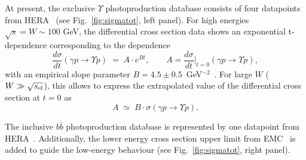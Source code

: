 \documentclass[10pt,prd,aps,nofootinbib,superscriptaddress]{revtex4}
\newcommand{\beq}{\begin{equation}}
\newcommand{\eeq}{\end{equation}}
\begin{document}
At present, the exclusive $\Upsilon$ photoproduction database
consists of four datapoints from HERA~\cite{Adloff:2000vm, Breitweg:1998ki, Chekanov:2009zz}
(see Fig.~\ref{fig:sigmatot}, left panel).
For high energies $\sqrt{s} = W\sim100$ GeV, the differential cross section data shows an exponential t-dependence 
corresponding to the dependence
\beq
\frac{d \sigma}{dt} (\gamma p \to \Upsilon p)
\;=\; A \cdot e^{Bt}, \quad \quad 
A = \frac{d \sigma}{dt} \biggr|_{t = 0} (\gamma p \to \Upsilon p) ,
\label{eq:bdef}
\eeq
with an empirical slope parameter $B=4.5\pm0.5$~GeV$^{-2}$~\cite{Chekanov:2009zz}. 
For large $W$ ($W \gg \sqrt{s_{\rm el}}$), this allows to express the extrapolated value of the differential cross section at $t=0$ as
\beq
A \;\simeq\;
 B\cdot\sigma (\gamma p \to \Upsilon p) .
\label{eq:brel}
\eeq

The inclusive $b \bar b$ photoproduction database is represented by one datapoint from HERA~\cite{Adloff:1999nr}.
Additionally, the lower energy cross section upper limit from EMC~\cite{Aubert:1981gx}
is added to guide the low-energy behaviour (see Fig.~\ref{fig:sigmatot}, right panel).
\end{document}
